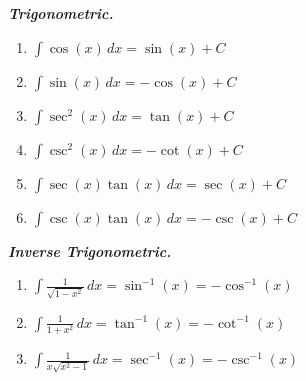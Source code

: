 \textbf{\textit{Trigonometric.}}
\begin{enumerate}
    \item $\int \cos(x) \,dx = \sin(x) + C$
    \item $\int \sin(x) \,dx = -\cos(x) + C$
    \item $\int \sec^2(x) \,dx = \tan(x) + C$
    \item $\int \csc^2(x) \,dx = -\cot(x) + C$
    \item $\int \sec(x) \tan(x) \,dx = \sec(x) + C$
    \item $\int \csc(x) \tan(x) \,dx = -\csc(x) + C$
\end{enumerate}

\textbf{\textit{Inverse Trigonometric.}}
\begin{enumerate}
    \item $\int \frac{1}{\sqrt{1 - x^2}} \,dx = \sin^{-1} (x) = -\cos^{-1} (x)$
    \item $\int \frac{1}{1 + x^2} \,dx = \tan^{-1} (x) = -\cot^{-1} (x)$
    \item $\int \frac{1}{x\sqrt{x^2 - 1}} \,dx = \sec^{-1} (x) = -\csc^{-1} (x)$
\end{enumerate}

